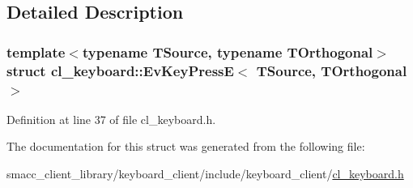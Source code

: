 \subsection{Detailed Description}
\subsubsection*{template$<$typename T\+Source, typename T\+Orthogonal$>$\newline
struct cl\+\_\+keyboard\+::\+Ev\+Key\+Press\+E$<$ T\+Source, T\+Orthogonal $>$}



Definition at line 37 of file cl\+\_\+keyboard.\+h.



The documentation for this struct was generated from the following file\+:\begin{DoxyCompactItemize}
\item 
smacc\+\_\+client\+\_\+library/keyboard\+\_\+client/include/keyboard\+\_\+client/\hyperlink{cl__keyboard_8h}{cl\+\_\+keyboard.\+h}\end{DoxyCompactItemize}
